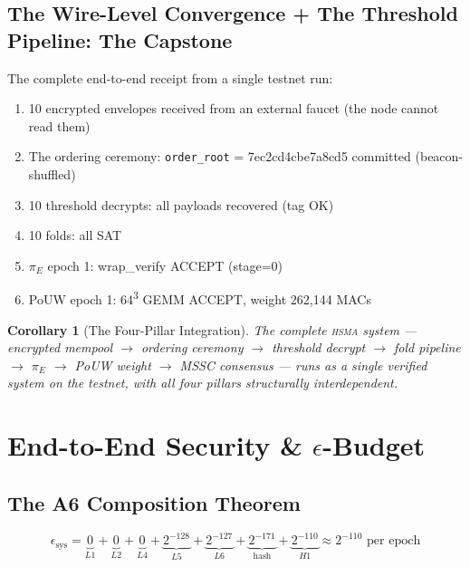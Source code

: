 \documentclass[11pt, a4paper]{article}
\newtheorem{corollary}[theorem]{Corollary}
\newcommand{\hsma}{\textsc{hsma}}
\begin{document}
\subsection{The Wire-Level Convergence + The Threshold Pipeline: The Capstone}

The complete end-to-end receipt from a single testnet run:

\begin{enumerate}
\item 10 encrypted envelopes received from an external faucet (the node cannot read them)
\item The ordering ceremony: \texttt{order\_root} = 7ec2cd4cbe7a8cd5 committed (beacon-shuffled)
\item 10 threshold decrypts: all payloads recovered (tag OK)
\item 10 folds: all SAT
\item $\pi_E$ epoch 1: wrap\_verify ACCEPT (stage=0)
\item PoUW epoch 1: 64\textsuperscript{3} GEMM ACCEPT, weight 262{,}144 MACs
\end{enumerate}

\begin{corollary}[The Four-Pillar Integration]
\label{cor:integration}
The complete \hsma{} system --- encrypted mempool $\to$ ordering ceremony $\to$ threshold decrypt $\to$ fold pipeline $\to$ $\pi_E$ $\to$ PoUW weight $\to$ MSSC consensus --- runs as a single verified system on the testnet, with all four pillars structurally interdependent.
\end{corollary}

\section{End-to-End Security \& $\epsilon$-Budget}

\subsection{The A6 Composition Theorem}

\begin{equation}
\epsilon_{\text{sys}} = \underbrace{0}_{L1} + \underbrace{0}_{L2} + \underbrace{0}_{L4} + \underbrace{2^{-128}}_{L5} + \underbrace{2^{-127}}_{L6} + \underbrace{2^{-171}}_{\text{hash}} + \underbrace{2^{-110}}_{H1} \approx 2^{-110} \text{ per epoch}
\end{equation}
\end{document}
